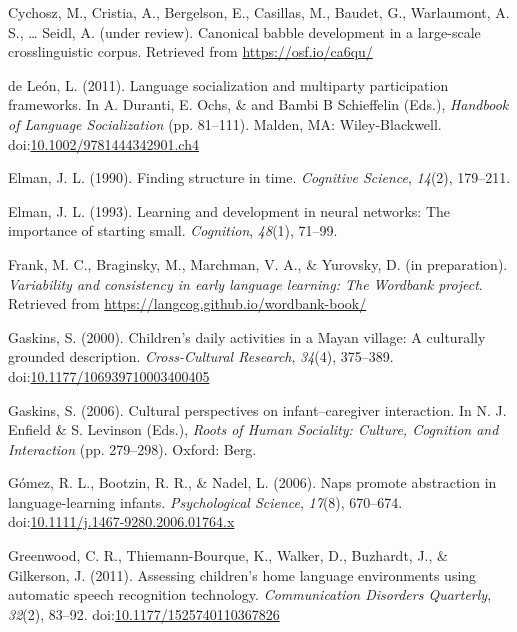 \documentclass[,man,floatsintext]{apa6}
\begin{document}
\hypertarget{ref-cychoszURcanonical}{}
Cychosz, M., Cristia, A., Bergelson, E., Casillas, M., Baudet, G.,
Warlaumont, A. S., \ldots{} Seidl, A. (under review). Canonical babble
development in a large-scale crosslinguistic corpus. Retrieved from
\url{https://osf.io/ca6qu/}

\hypertarget{ref-deleon2011language}{}
de León, L. (2011). Language socialization and multiparty participation
frameworks. In A. Duranti, E. Ochs, \& and Bambi B Schieffelin (Eds.),
\emph{Handbook of Language Socialization} (pp. 81--111). Malden, MA:
Wiley-Blackwell.
doi:\href{https://doi.org/10.1002/9781444342901.ch4}{10.1002/9781444342901.ch4}

\hypertarget{ref-elman1990finding}{}
Elman, J. L. (1990). Finding structure in time. \emph{Cognitive
Science}, \emph{14}(2), 179--211.

\hypertarget{ref-elman1993learning}{}
Elman, J. L. (1993). Learning and development in neural networks: The
importance of starting small. \emph{Cognition}, \emph{48}(1), 71--99.

\hypertarget{ref-frankIPvariability}{}
Frank, M. C., Braginsky, M., Marchman, V. A., \& Yurovsky, D. (in
preparation). \emph{Variability and consistency in early language
learning: The Wordbank project}. Retrieved from
\url{https://langcog.github.io/wordbank-book/}

\hypertarget{ref-gaskins2000childrens}{}
Gaskins, S. (2000). Children's daily activities in a Mayan village: A
culturally grounded description. \emph{Cross-Cultural Research},
\emph{34}(4), 375--389.
doi:\href{https://doi.org/10.1177/106939710003400405}{10.1177/106939710003400405}

\hypertarget{ref-gaskins2006cultural}{}
Gaskins, S. (2006). Cultural perspectives on infant--caregiver
interaction. In N. J. Enfield \& S. Levinson (Eds.), \emph{Roots of
Human Sociality: Culture, Cognition and Interaction} (pp. 279--298).
Oxford: Berg.

\hypertarget{ref-gomez2006naps}{}
Gómez, R. L., Bootzin, R. R., \& Nadel, L. (2006). Naps promote
abstraction in language-learning infants. \emph{Psychological Science},
\emph{17}(8), 670--674.
doi:\href{https://doi.org/10.1111/j.1467-9280.2006.01764.x}{10.1111/j.1467-9280.2006.01764.x}

\hypertarget{ref-greenwood2011assessing}{}
Greenwood, C. R., Thiemann-Bourque, K., Walker, D., Buzhardt, J., \&
Gilkerson, J. (2011). Assessing children's home language environments
using automatic speech recognition technology. \emph{Communication
Disorders Quarterly}, \emph{32}(2), 83--92.
doi:\href{https://doi.org/10.1177/1525740110367826}{10.1177/1525740110367826}
\end{document}
